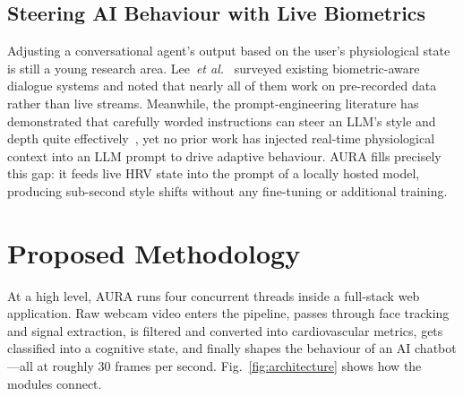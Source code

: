 \documentclass[conference]{IEEEtran}
\begin{document}
\subsection{Steering AI Behaviour with Live Biometrics}

Adjusting a conversational agent's output based on the user's
physiological state is still a young research area.
Lee~\emph{et al.}~\cite{lee2024humanai} surveyed existing
biometric-aware dialogue systems and noted that nearly all of
them work on pre-recorded data rather than live streams.
Meanwhile, the prompt-engineering literature has demonstrated
that carefully worded instructions can steer an LLM's style
and depth quite effectively~\cite{brown2020language,
wei2022chain}, yet no prior work has injected real-time
physiological context into an LLM prompt to drive adaptive
behaviour. \textsc{AURA} fills precisely this gap: it feeds
live HRV state into the prompt of a locally hosted model,
producing sub-second style shifts without any fine-tuning
or additional training.


\section{Proposed Methodology}
\label{sec:methodology}

At a high level, \textsc{AURA} runs four concurrent threads inside
a full-stack web application. Raw webcam video enters the pipeline,
passes through face tracking and signal extraction, is filtered and
converted into cardiovascular metrics, gets classified into a
cognitive state, and finally shapes the behaviour of an AI
chatbot---all at roughly 30 frames per second.
Fig.~\ref{fig:architecture} shows how the modules connect.
\end{document}

